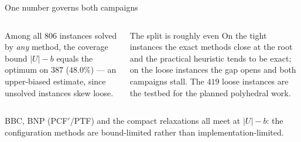 \documentclass[10pt]{beamer}
\newcommand{\U}{U}\newcommand{\Kst}{K^{\ast}}\newcommand{\Zst}{Z^{\ast}}
\newcommand{\cov}{\lvert\U\rvert-b}
\newcommand{\good}[1]{\textcolor{tight}{#1}}
\newcommand{\bad}[1]{\textcolor{acc}{#1}}
\begin{document}
\begin{frame}{One number governs both campaigns}
\begin{columns}[c]
\centering
{}
Among all $806$ instances solved by \emph{any} method, the coverage bound $\cov$ equals
the optimum on $387$ ($48.0\%$) --- an upper-biased estimate, since unsolved instances
skew loose.
\vspace{2mm}
\begin{block}{The split is roughly even}
On the \good{tight} instances the exact methods close at the root and the practical
heuristic tends to be exact; on the \bad{loose} instances the gap opens and both
campaigns stall. The $419$ loose instances are the testbed for the planned polyhedral
work.
\end{block}
\end{columns}
\vspace{1mm}
\begin{center}\footnotesize
BBC, BNP (PCF$'$/PTF) and the compact relaxations all meet at $\cov$: the configuration
methods are bound-limited rather than implementation-limited.
\end{center}
\end{frame}
\end{document}
